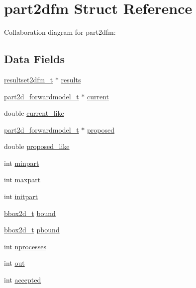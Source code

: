 \hypertarget{structpart2dfm}{}\section{part2dfm Struct Reference}
\label{structpart2dfm}


Collaboration diagram for part2dfm\+:
\subsection*{Data Fields}
\begin{DoxyCompactItemize}
\item 
\hyperlink{resultset2dfm_8h_a24e8e056571b4ea36ad75ac908973669}{resultset2dfm\+\_\+t} $\ast$ \hyperlink{structpart2dfm_a8dbbf73b3c5e1d02ab42922c72a5f804}{results}
\item 
\hyperlink{part2d__forwardmodel_8h_abe003f55322475b0dd158343b3916a13}{part2d\+\_\+forwardmodel\+\_\+t} $\ast$ \hyperlink{structpart2dfm_ac5b024b70caf5a93dfe11c68e4276d91}{current}
\item 
double \hyperlink{structpart2dfm_a6d04019e1d6b26f5b7971a0b059d7b03}{current\+\_\+like}
\item 
\hyperlink{part2d__forwardmodel_8h_abe003f55322475b0dd158343b3916a13}{part2d\+\_\+forwardmodel\+\_\+t} $\ast$ \hyperlink{structpart2dfm_a1d002ed5bc6e090de2aed680a1596d1f}{proposed}
\item 
double \hyperlink{structpart2dfm_ad8af80db96a56e597f77adfc1a816177}{proposed\+\_\+like}
\item 
int \hyperlink{structpart2dfm_aaab4cc956caa7ed50e9ceca65c18ee74}{minpart}
\item 
int \hyperlink{structpart2dfm_a4bf2b8b0f9a31d52a4640b5d9e0154ab}{maxpart}
\item 
int \hyperlink{structpart2dfm_abbefe668a58ae58f174039986929d790}{initpart}
\item 
\hyperlink{bbox2d_8h_a1c61505f6f1c486a673ba4547602b9df}{bbox2d\+\_\+t} \hyperlink{structpart2dfm_ac122d0a6bd19305b1cc5f5b4c90664e3}{bound}
\item 
\hyperlink{bbox2d_8h_a1c61505f6f1c486a673ba4547602b9df}{bbox2d\+\_\+t} \hyperlink{structpart2dfm_ab583315c812c76131356179513b0d8a4}{pbound}
\item 
int \hyperlink{structpart2dfm_a9d5bf1d22e9b4ef82a99c9ddf819f442}{nprocesses}
\item 
int \hyperlink{structpart2dfm_a3d98012e3410c80ada60035faf82dbb1}{out}
\item 
int \hyperlink{structpart2dfm_a28291682ec748246ce4c758172bffe32}{accepted}

\end{DoxyCompactItemize}
